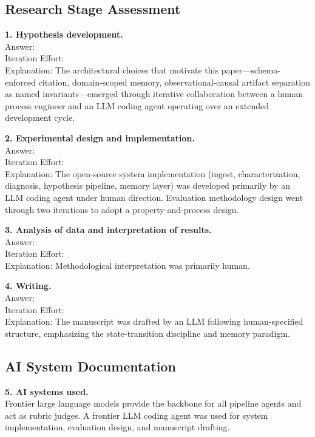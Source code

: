 \documentclass[11pt]{article}
\begin{document}
\subsection*{Research Stage Assessment}

\textbf{1. Hypothesis development.}\\
Answer: \\
Iteration Effort: \iterationHigh\\
Explanation: The architectural choices that motivate this paper—schema-enforced citation, domain-scoped memory, observational-causal artifact separation as named invariants—emerged through iterative collaboration between a human process engineer and an LLM coding agent operating over an extended development cycle. 

\textbf{2. Experimental design and implementation.}\\
Answer: \\
Iteration Effort: \iterationHigh\\
Explanation: The open-source system implementation (ingest, characterization, diagnosis, hypothesis pipeline, memory layer) was developed primarily by an LLM coding agent under human direction. Evaluation methodology design went through two iterations to adopt a property-and-process design.

\textbf{3. Analysis of data and interpretation of results.}\\
Answer: \\
Iteration Effort: \iterationLow\\
Explanation: Methodological interpretation was primarily human.

\textbf{4. Writing.}\\
Answer: \\
Iteration Effort: \iterationMedium\\
Explanation: The manuscript was drafted by an LLM following human-specified structure, emphasizing the state-transition discipline and memory paradigm.

\subsection*{AI System Documentation}

\textbf{5. AI systems used.}\\
Frontier large language models provide the backbone for all pipeline agents and act as rubric judges. A frontier LLM coding agent was used for system implementation, evaluation design, and manuscript drafting.
\end{document}
